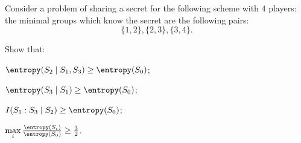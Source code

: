 Consider a problem of sharing a secret for the following scheme with $4$ players: the minimal groups
which know the secret are the following pairs:
$$
    \{1, 2\}, \{2, 3\}, \{3, 4\}.
$$

Show that:
\begin{enumlet}
    \item $\entropy(S_2 \mid S_1, S_3) \ge \entropy(S_0)$;
    \item $\entropy(S_3 \mid S_1) \ge \entropy(S_0)$;
    \item $I(S_1 : S_3 \mid S_2) \ge \entropy(S_0)$;
    \item $\max\limits_i \frac{\entropy(S_i)}{\entropy(S_0)} \ge \frac{3}{2}$.
\end{enumlet}